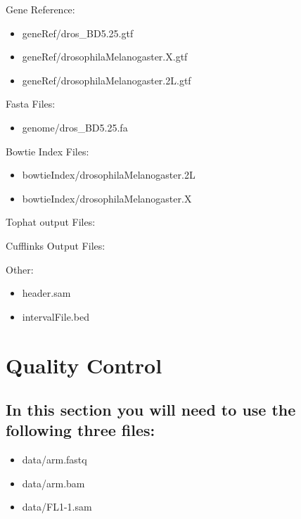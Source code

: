 \documentclass[letterpaper,10pt,english]{sphinxmanual}
\begin{document}
Gene Reference:
\begin{itemize}
\item {} 
geneRef/dros\_BD5.25.gtf

\item {} 
geneRef/drosophilaMelanogaster.X.gtf

\item {} 
geneRef/drosophilaMelanogaster.2L.gtf

\end{itemize}

Fasta Files:
\begin{itemize}
\item {} 
genome/dros\_BD5.25.fa

\end{itemize}

Bowtie Index Files:
\begin{itemize}
\item {} 
bowtieIndex/drosophilaMelanogaster.2L

\item {} 
bowtieIndex/drosophilaMelanogaster.X

\end{itemize}

Tophat output Files:

Cufflinks Output Files:

Other:
\begin{itemize}
\item {} 
header.sam

\item {} 
intervalFile.bed

\end{itemize}


\chapter{Quality Control}
\label{STEP1_QualityControl:quality-control}\label{STEP1_QualityControl::doc}

\section{In this section you will need to use the following three files:}
\label{STEP1_QualityControl:in-this-section-you-will-need-to-use-the-following-three-files}\begin{itemize}
\item {} 
data/arm.fastq

\item {} 
data/arm.bam

\item {} 
data/FL1-1.sam

\end{itemize}
\end{document}
